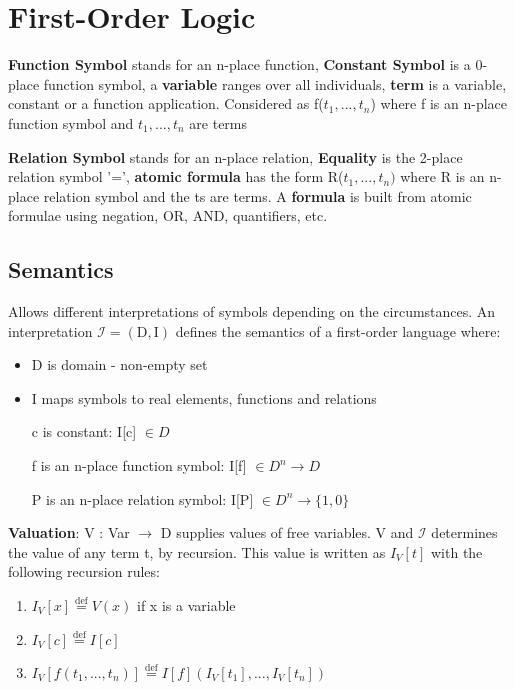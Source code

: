 \documentclass{article}
\begin{document}
\section{First-Order Logic}
\textbf{Function Symbol} stands for an n-place function, \textbf{Constant Symbol} is a 0-place function symbol, a \textbf{variable} ranges over all individuals, \textbf{term} is a variable, constant or a function application. Considered as f($t_{1}, ..., t_{n}$) where f is an n-place function symbol and $t_{1}, ..., t_{n}$ are terms

\bigskip
\noindent
\textbf{Relation Symbol} stands for an n-place relation, \textbf{Equality} is the 2-place relation symbol '=', \textbf{atomic formula} has the form R($t_{1}, ..., t_{n})$ where R is an n-place relation symbol and the ts are terms. A \textbf{formula} is built from atomic formulae using negation, OR, AND, quantifiers, etc.

\subsection{Semantics}
Allows different interpretations of symbols depending on the circumstances. An interpretation $\mathcal{I}=(\mathrm{D}, \mathrm{I})$ defines the semantics of a first-order language where:
\begin{itemize}
    \item D is domain - non-empty set
    \item I maps symbols to real elements, functions and relations
    
    c is constant: I[c] $\in D$
    
    f is an n-place function symbol: I[f] $\in D^{n} \rightarrow D$
    
    P is an n-place relation symbol: I[P] $\in D^{n} \rightarrow \{ 1, 0 \}$
\end{itemize}

\bigskip
\noindent
\textbf{Valuation}: V : Var $\rightarrow$ D supplies values of free variables. V and $\mathcal{I}$ determines the value of any term t, by recursion. This value is written as $I_{V}[t]$ with the following recursion rules:
\begin{enumerate}
    \item $I_{V}[x] \stackrel{\mathrm{def}}{=} V(x) $ if x is a variable
    \item $I_{V}[c] \stackrel{\mathrm{def}}{=} I[c]$
    \item $I_{V}[f(t_{1}, ..., t_{n})] \stackrel{\mathrm{def}}{=} I[f](I_{V}[t_{1}], ..., I_{V}[t_{n}])$
\end{enumerate}
\end{document}
